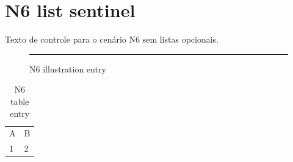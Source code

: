 \documentclass{abntexto-ufc}
\begin{document}
\pretextual

\textual
\section{N6 list sentinel}
Texto de controle para o cenário N6 sem listas opcionais.

\begin{figure}[h]
  \centering
  \rule{10cm}{2cm}
  \caption{N6 illustration entry}
\end{figure}

\begin{table}[h]
  \centering
  \caption{N6 table entry}
  \begin{tabular}{p{4cm}p{4cm}}
    A & B \\
    1 & 2
  \end{tabular}
\end{table}
\end{document}
